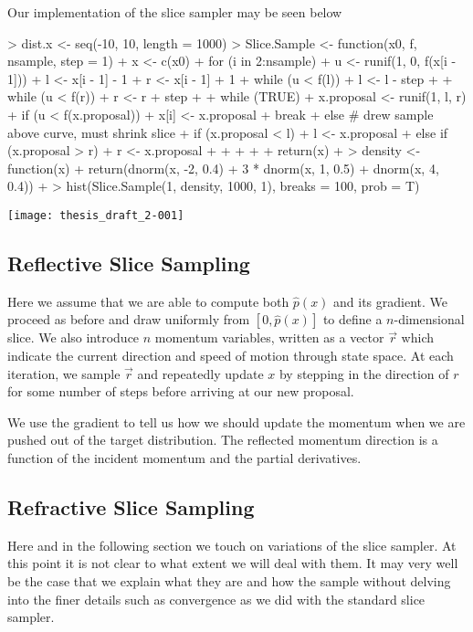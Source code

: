 \documentclass[11pt, a4paper]{article}
\theoremstyle{plain}
\theoremstyle{definition}
\begin{document}
Our implementation of the slice sampler may be seen below
\begin{Schunk}
\begin{Sinput}
> dist.x <- seq(-10, 10, length = 1000)
> Slice.Sample <- function(x0, f, nsample, step = 1) {
+   x <- c(x0)
+   for (i in 2:nsample) {
+     u <- runif(1, 0, f(x[i - 1]))
+     l <- x[i - 1] - 1
+     r <- x[i - 1] + 1
+     while (u < f(l)) {
+       l <- l - step
+     }
+     while (u < f(r)) {
+       r <- r + step
+     }
+     while (TRUE) {
+       x.proposal <- runif(1, l, r)
+       if (u < f(x.proposal)) {
+         x[i] <- x.proposal
+         break
+       } else { # drew sample above curve, must shrink slice
+         if (x.proposal < l) {
+           l <- x.proposal
+         } else if (x.proposal > r) {
+           r <- x.proposal
+         }
+       }
+     }
+   }
+   return(x)
+ }
> density <- function(x) { 
+   return(dnorm(x, -2, 0.4) + 3 * dnorm(x, 1, 0.5) + dnorm(x, 4, 0.4))
+ }
> hist(Slice.Sample(1, density, 1000, 1), breaks = 100, prob = T)
\end{Sinput}
\end{Schunk}
\texttt{[image: thesis\_draft\_2-001]}

\subsection{Reflective Slice Sampling}
Here we assume that we are able to compute both $\hat{p}(x)$ and its gradient. We proceed 
as before and draw uniformly from $[0, \hat{p}(x)]$ to define a $n$-dimensional
slice. We also introduce $n$ momentum variables, written as a vector $\vec{r}$
which indicate the current direction and speed of motion through state space.
At each iteration, we sample $\vec{r}$ and repeatedly update $x$ by stepping
in the direction of $r$ for some number of steps before arriving at
our new proposal.

We use the gradient to tell us how we should update the momentum when we
are pushed out of the target distribution. The reflected momentum direction is 
a function of the incident momentum and the partial derivatives.

\subsection{Refractive Slice Sampling}
Here and in the following section we touch on variations of the slice sampler.
At this point it is not clear to what extent we will deal with them. It may
very well be the case that we explain what they are and how the sample without delving into
the finer details such as convergence as we did with the standard slice sampler.
\end{document}
